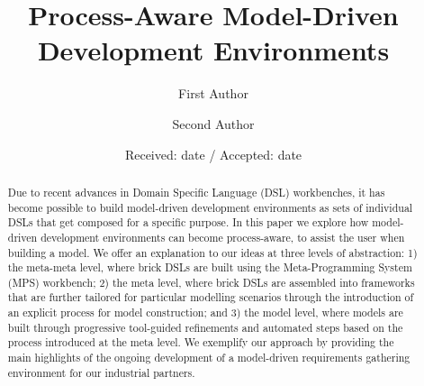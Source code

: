 \usepackage[linewidth=1pt]{mdframed}
\usepackage{lipsum}  

\newcommand\levi[1]{\nb{Levi}{\textcolor{teal}{#1}}}
\newcommand\moussa[1]{\nb{Moussa}{\textcolor{blue}{#1}}}
\newcommand\adrien[1]{\nb{Adrien}{\textcolor{red}{#1}}}

\usepackage[font={small}]{caption, subfig}

% 


\title{Process-Aware Model-Driven Development Environments}


\author{First Author         \and
        Second Author %
}



\date{Received: date / Accepted: date}


\maketitle

\begin{abstract}
Due to recent advances in Domain Specific Language (DSL) workbenches,
it has become possible to build model-driven development environments
as sets of individual DSLs that get composed for a specific purpose. In
this paper we explore how model-driven development environments can become
process-aware, to assist the user when building a model. We offer an
explanation to our ideas at three levels of abstraction: 1) the meta-meta level,
where brick DSLs are built using the Meta-Programming System (MPS) workbench;
2) the meta level, where brick DSLs are assembled into frameworks that
are further tailored for particular modelling scenarios through the introduction
of an explicit process for model construction; and 3) the model level, where
models are built through progressive tool-guided refinements and automated
steps based on the process introduced at the meta level. We exemplify our
approach by providing the main highlights of the ongoing development of a
model-driven requirements gathering environment for our industrial partners.
\levi{abstract from workshop paper, needs to be rewritten}
\end{abstract}

